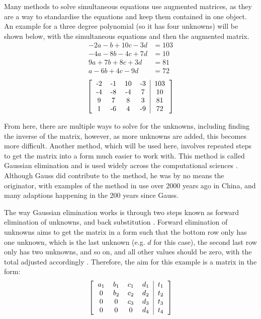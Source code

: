 \documentclass{article}
\begin{document}
Many methods to solve simultaneous equations use augmented matrices, as they are a way to standardise the equations and keep them contained in one object. An example for a three degree polynomial (so it has four unknowns) will be shown below, with the simultaneous equations and then the augmented matrix.
\begin{align*}
    -2a - b + 10c - 3d &= 103 \\
    -4a - 8b -4c + 7d &= 10 \\
    9a + 7b + 8c + 3d &= 81 \\
    a - 6b + 4c - 9d &= 72
\end{align*}
\[
\begin{bmatrix}
    \begin{tabular}{cccc|c}
    -2 & -1 & 10 & -3 & 103\\
    -4 & -8 & -4 & 7 & 10\\
    9 & 7 & 8 & 3 & 81\\
    1 & -6 & 4 & -9 & 72
    \end{tabular}
\end{bmatrix}\]

From here, there are multiple ways to solve for the unknowns, including finding the inverse of the matrix, however, as more unknowns are added, this becomes more difficult. Another method, which will be used here, involves repeated steps to get the matrix into a form much easier to work with. This method is called Gaussian elimination and is used widely across the computational sciences \cite{eliminationhistory}. Although Gauss did contribute to the method, he was by no means the originator, with examples of the method in use over 2000 years ago in China, and many adaptions happening in the 200 years since Gauss.

The way Gaussian elimination works is through two steps known as forward elimination of unknowns, and back substitution \cite{eliminationmethod}. Forward elimination of unknowns aims to get the matrix in a form such that the bottom row only has one unknown, which is the last unknown (e.g. \(d\) for this case), the second last row only has two unknowns, and so on, and all other values should be zero, with the total adjusted accordingly \cite{eliminationmethod}. Therefore, the aim for this example is a matrix in the form:
\[
\begin{bmatrix}
    \begin{tabular}{cccc|c}
    $a_1$ & $b_1$ & $c_1$ & $d_1$ & $t_1$\\
    0 & $b_2$ & $c_2$ & $d_2$ & $t_2$\\
    0 & 0 & $c_3$ & $d_3$ & $t_3$\\
    0 & 0 & 0 & $d_4$ & $t_4$
    \end{tabular}
\end{bmatrix}\]
\end{document}
